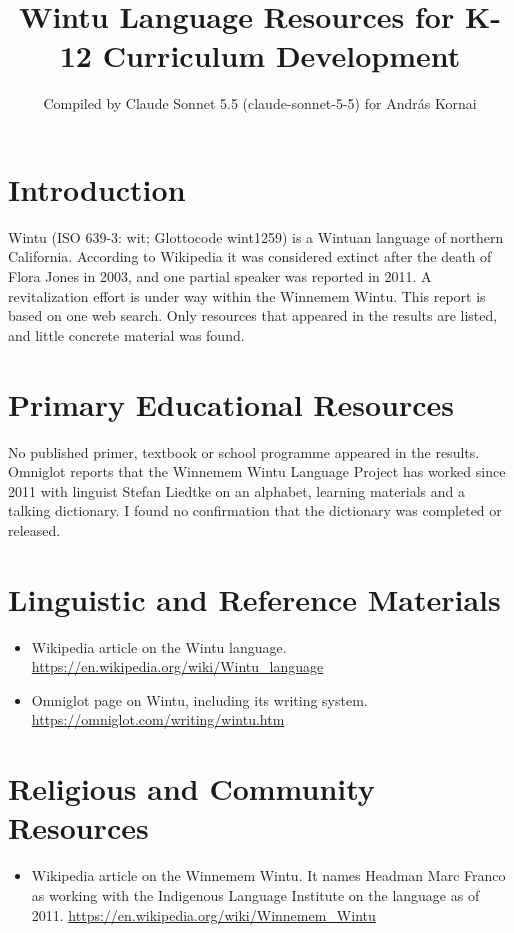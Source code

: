 \documentclass[12pt]{article}
\title{Wintu Language Resources for K-12 Curriculum Development}
\author{Compiled by Claude Sonnet 5.5 (claude-sonnet-5-5) for Andr\'as Kornai}
\date{}
\begin{document}
\maketitle

\section{Introduction}
Wintu (ISO 639-3: wit; Glottocode wint1259) is a Wintuan language of northern California. According to Wikipedia it was considered extinct after the death of Flora Jones in 2003, and one partial speaker was reported in 2011. A revitalization effort is under way within the Winnemem Wintu. This report is based on one web search. Only resources that appeared in the results are listed, and little concrete material was found.

\section{Primary Educational Resources}
No published primer, textbook or school programme appeared in the results. Omniglot reports that the Winnemem Wintu Language Project has worked since 2011 with linguist Stefan Liedtke on an alphabet, learning materials and a talking dictionary. I found no confirmation that the dictionary was completed or released.

\section{Linguistic and Reference Materials}
\begin{itemize}
\item Wikipedia article on the Wintu language. \url{https://en.wikipedia.org/wiki/Wintu_language}
\item Omniglot page on Wintu, including its writing system. \url{https://omniglot.com/writing/wintu.htm}
\end{itemize}

\section{Religious and Community Resources}
\begin{itemize}
\item Wikipedia article on the Winnemem Wintu. It names Headman Marc Franco as working with the Indigenous Language Institute on the language as of 2011. \url{https://en.wikipedia.org/wiki/Winnemem_Wintu}
\end{itemize}
\end{document}
